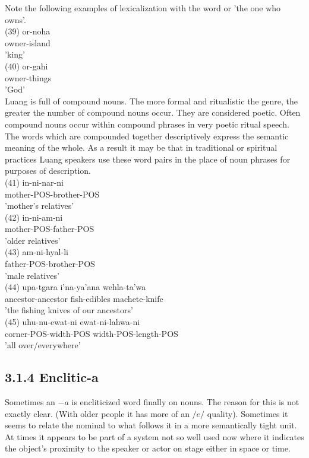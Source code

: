 \documentclass[10pt]{article}
\begin{document}
Note the following examples of lexicalization with the word or 'the one who owns'.\\
(39) or-noha\\
owner-island\\
'king'\\
(40) or-gahi\\
owner-things\\
'God'\\
Luang is full of compound nouns. The more formal and ritualistic the genre, the greater the number of compound nouns occur. They are considered poetic. Often compound nouns occur within compound phrases in very poetic ritual speech. The words which are compounded together descriptively express the semantic meaning of the whole. As a result it may be that in traditional or spiritual practices Luang speakers use these word pairs in the place of noun phrases for purposes of description.\\
(41) in-ni-nar-ni\\
mother-POS-brother-POS\\
'mother's relatives'\\
(42) in-ni-am-ni\\
mother-POS-father-POS\\
'older relatives'\\
(43) am-ni-hyal-li\\
father-POS-brother-POS\\
'male relatives'\\
(44) upa-tgara i'na-ya'ana wehla-ta'wa\\
ancestor-ancestor fish-edibles machete-knife\\
'the fishing knives of our ancestors'\\
(45) uhu-nu-ewat-ni ewat-ni-lahwa-ni\\
corner-POS-width-POS width-POS-length-POS\\
'all over/everywhere'

\subsection*{3.1.4 Enclitic-a}
Sometimes an \(-a\) is encliticized word finally on nouns. The reason for this is not exactly clear. (With older people it has more of an \(/ e /\) quality). Sometimes it seems to relate the nominal to what follows it in a more semantically tight unit. At times it appears to be part of a system not so well used now where it indicates the object's proximity to the speaker or actor on stage either in space or time.
\end{document}
